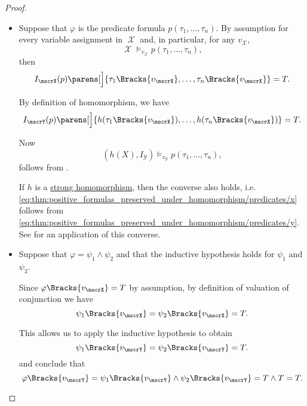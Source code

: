 \begin{proof}
\begin{itemize}
    \item Suppose that \( \varphi \) is the predicate formula \( p(\tau_1, \ldots, \tau_n) \). By assumption for every variable assignment in \( \mscrX \) and, in particular, for any \( v_\mscrX \),
    \begin{equation*}
      \mscrX \vDash_{v_\mscrX} p(\tau_1, \ldots, \tau_n),
    \end{equation*}
    then
    \begin{equation}\label{eq:thm:positive_formulas_preserved_under_homomorphism/predicates/x}
      I_\mscrX(p) \parens[\Big]{ \tau_1\Bracks{v_\mscrX}, \ldots, \tau_n\Bracks{v_\mscrX} } = T.
    \end{equation}

    By definition of homomorphism, we have
    \begin{equation}\label{eq:thm:positive_formulas_preserved_under_homomorphism/predicates/y}
      I_\mscrY(p) \parens[\Big]{ h(\tau_1\Bracks{v_\mscrX}), \ldots, h(\tau_n\Bracks{v_\mscrX}) } = T.
    \end{equation}

    Now
    \begin{equation*}
      (h(X), I_\mscrY) \vDash_{v_\mscrY} p(\tau_1, \ldots, \tau_n),
    \end{equation*}
    follows from .

    If \( h \) is a \hyperref[rem:first_order_strong_homomorphism]{strong homomorphism}, then the converse also holds, i.e. \eqref{eq:thm:positive_formulas_preserved_under_homomorphism/predicates/x} follows from \eqref{eq:thm:positive_formulas_preserved_under_homomorphism/predicates/y}. See  for an application of this converse.

    \item Suppose that \( \varphi = \psi_1 \wedge \psi_2 \) and that the inductive hypothesis holds for \( \psi_1 \) and \( \psi_2 \).

    Since \( \varphi\Bracks{v_\mscrX} = T \) by assumption, by definition of valuation of conjunction we have
    \begin{equation*}
      \psi_1\Bracks{v_\mscrX}
      =
      \psi_2\Bracks{v_\mscrX}
      =
      T.
    \end{equation*}

    This allows us to apply the inductive hypothesis to obtain
    \begin{equation*}
      \psi_1\Bracks{v_\mscrY}
      =
      \psi_2\Bracks{v_\mscrY}
      =
      T.
    \end{equation*}
    and conclude that
    \begin{equation*}
      \varphi\Bracks{v_\mscrY}
      =
      \psi_1\Bracks{v_\mscrY} \wedge \psi_2\Bracks{v_\mscrY}
      =
      T \wedge T
      =
      T.
    \end{equation*}


\end{itemize}
\end{proof}
